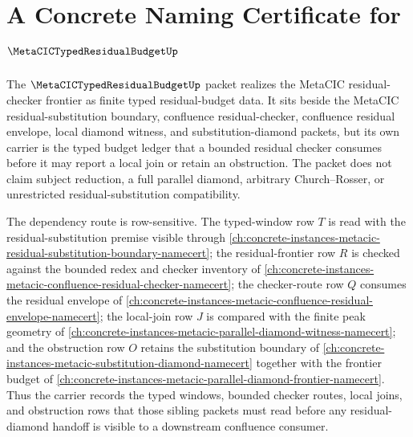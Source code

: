\chapter{A Concrete Naming Certificate for $\MetaCICTypedResidualBudgetUp$}
\label{ch:concrete-instances-metacic-typed-residual-budget-namecert}

The $\MetaCICTypedResidualBudgetUp$ packet realizes the MetaCIC residual-checker frontier as finite typed residual-budget data. It sits beside the MetaCIC residual-substitution boundary, confluence residual-checker, confluence residual envelope, local diamond witness, and substitution-diamond packets, but its own carrier is the typed budget ledger that a bounded residual checker consumes before it may report a local join or retain an obstruction. The packet does not claim subject reduction, a full parallel diamond, arbitrary Church--Rosser, or unrestricted residual-substitution compatibility.

The dependency route is row-sensitive. The typed-window row $T$ is read with the residual-substitution premise visible through \autoref{ch:concrete-instances-metacic-residual-substitution-boundary-namecert}; the residual-frontier row $R$ is checked against the bounded redex and checker inventory of \autoref{ch:concrete-instances-metacic-confluence-residual-checker-namecert}; the checker-route row $Q$ consumes the residual envelope of \autoref{ch:concrete-instances-metacic-confluence-residual-envelope-namecert}; the local-join row $J$ is compared with the finite peak geometry of \autoref{ch:concrete-instances-metacic-parallel-diamond-witness-namecert}; and the obstruction row $O$ retains the substitution boundary of \autoref{ch:concrete-instances-metacic-substitution-diamond-namecert} together with the frontier budget of \autoref{ch:concrete-instances-metacic-parallel-diamond-frontier-namecert}. Thus the carrier records the typed windows, bounded checker routes, local joins, and obstruction rows that those sibling packets must read before any residual-diamond handoff is visible to a downstream confluence consumer.

